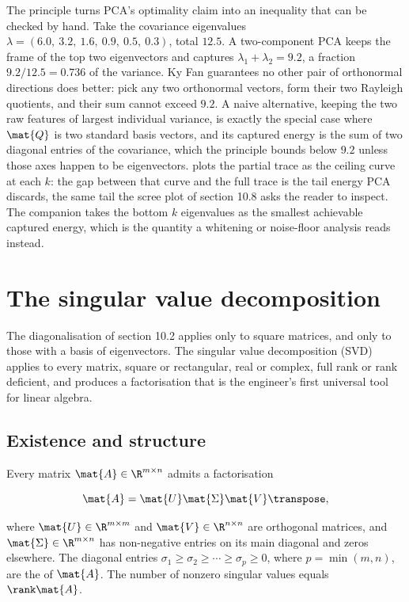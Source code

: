 \begin{example}
The principle turns PCA's optimality claim into an inequality that can
be checked by hand. Take the covariance eigenvalues $\lambda =
(6.0,\ 3.2,\ 1.6,\ 0.9,\ 0.5,\ 0.3)$, total $12.5$. A two-component PCA
keeps the frame of the top two eigenvectors and captures $\lambda_{1} +
\lambda_{2} = 9.2$, a fraction $9.2/12.5 = 0.736$ of the variance. Ky
Fan guarantees no other pair of orthonormal directions does better:
pick any two orthonormal vectors, form their two Rayleigh quotients,
and their sum cannot exceed $9.2$. A naive alternative, keeping the two
raw features of largest individual variance, is exactly the special
case where $\mat{Q}$ is two standard basis vectors, and its captured
energy is the sum of two diagonal entries of the covariance, which the
principle bounds below $9.2$ unless those axes happen to be
eigenvectors.  plots the
partial trace as the ceiling curve at each $k$: the gap between that
curve and the full trace is the tail energy PCA discards, the same tail
the scree plot of section 10.8 asks the reader to inspect. The
companion  takes the bottom $k$
eigenvalues as the smallest achievable captured energy, which is the
quantity a whitening or noise-floor analysis reads instead.
\end{example}



\section{The singular value decomposition}

The diagonalisation of section 10.2 applies only to square matrices,
and only to those with a basis of eigenvectors. The singular value
decomposition (SVD) applies to every matrix, square or rectangular,
real or complex, full rank or rank deficient, and produces a
factorisation that is the engineer's first universal tool for
linear algebra.

\subsection{Existence and structure}

\begin{theorem}
Every matrix $\mat{A} \in \R^{m \times n}$ admits a factorisation

\[
\mat{A} = \mat{U} \mat{\Sigma} \mat{V}\transpose,
\]

where $\mat{U} \in \R^{m \times m}$ and $\mat{V} \in \R^{n \times n}$
are orthogonal matrices, and $\mat{\Sigma} \in \R^{m \times n}$ has
non-negative entries on its main diagonal and zeros elsewhere. The
diagonal entries $\sigma_{1} \geq \sigma_{2} \geq \cdots \geq
\sigma_{p} \geq 0$, where $p = \min(m, n)$, are the
 of $\mat{A}$. The number of nonzero
singular values equals $\rank \mat{A}$.
\end{theorem}


